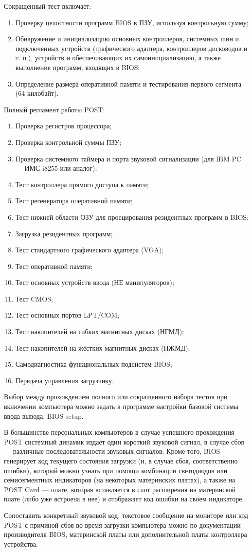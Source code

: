 Сокращённый тест включает:
\begin{enumerate}
 \item Проверку целостности программ BIOS в ПЗУ, используя контрольную сумму;
 \item Обнаружение и инициализацию основных контроллеров, системных шин и подключенных устройств (графического адаптера, контроллеров дисководов и т. п.), устройств и обеспечивающих их самоинициализацию, а также выполнение программ, входящих в BIOS;
 \item Определение размера оперативной памяти и тестирования первого сегмента (64 килобайт).
\end{enumerate}

Полный регламент работы POST:
\begin{enumerate}
 \item Проверка регистров процессора;
 \item Проверка контрольной суммы ПЗУ;
 \item Проверка системного таймера и порта звуковой сигнализации (для IBM PC — ИМС i8255 или аналог);
 \item Тест контроллера прямого доступа к памяти;
 \item Тест регенератора оперативной памяти;
 \item Тест нижней области ОЗУ для проецирования резидентных программ в BIOS;
 \item Загрузка резидентных программ;
 \item Тест стандартного графического адаптера (VGA);
 \item Тест оперативной памяти;
 \item Тест основных устройств ввода (НЕ манипуляторов);
 \item Тест CMOS;
 \item Тест основных портов LPT/COM;
 \item Тест накопителей на гибких магнитных дисках (НГМД);
 \item Тест накопителей на жёстких магнитных дисках (НЖМД);
 \item Самодиагностика функциональных подсистем BIOS;
 \item Передача управления загрузчику.
\end{enumerate}

Выбор между прохождением полного или сокращенного набора тестов при включении компьютера можно задать в программе настройки базовой системы ввода-вывода, BIOS setup.

В большинстве персональных компьютеров в случае успешного прохождения POST системный динамик издаёт один короткий звуковой сигнал, в случае сбоя --- различные последовательности звуковых сигналов. Кроме того, BIOS генерирует код текущего состояния загрузки (и, в случае сбоя, соответственно ошибки), который можно узнать при помощи комбинации светодиодов или семисегментных индикаторов (на некоторых материнских платах), а также на POST Card --- плате, которая вставляется в слот расширения на материнской плате (либо уже встроена в нее) и отображает код ошибки на своем индикаторе.
 
Сопоставить конкретный звуковой код, текстовое сообщение на мониторе или код POST с причиной сбоя во время загрузки компьютера можно по документации производителя BIOS, материнской платы или дополнительной платы контроллера устройства.
